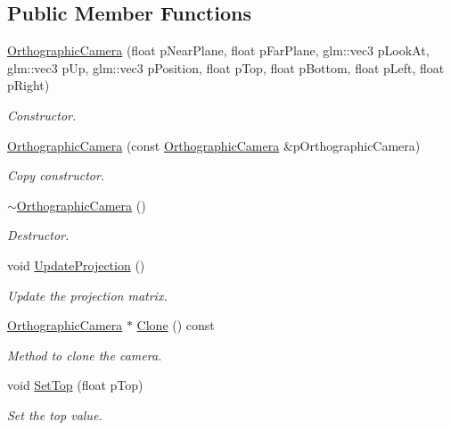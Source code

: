 \subsection*{Public Member Functions}
\begin{DoxyCompactItemize}
\item 
\hyperlink{class_orthographic_camera_a794762aa66ade1f025ca62304b2e8c40}{Orthographic\+Camera} (float p\+Near\+Plane, float p\+Far\+Plane, glm\+::vec3 p\+Look\+At, glm\+::vec3 p\+Up, glm\+::vec3 p\+Position, float p\+Top, float p\+Bottom, float p\+Left, float p\+Right)
\begin{DoxyCompactList}\small\item\em Constructor. \end{DoxyCompactList}\item 
\hyperlink{class_orthographic_camera_a889267a0f4815b523b07034d656986de}{Orthographic\+Camera} (const \hyperlink{class_orthographic_camera}{Orthographic\+Camera} \&p\+Orthographic\+Camera)
\begin{DoxyCompactList}\small\item\em Copy constructor. \end{DoxyCompactList}\item 
\hyperlink{class_orthographic_camera_a9c8a9cc81e87af987c6fcda276bdd52d}{$\sim$\+Orthographic\+Camera} ()
\begin{DoxyCompactList}\small\item\em Destructor. \end{DoxyCompactList}\item 
void \hyperlink{class_orthographic_camera_abea153f1372b655f423679015d42af52}{Update\+Projection} ()
\begin{DoxyCompactList}\small\item\em Update the projection matrix. \end{DoxyCompactList}\item 
\hyperlink{class_orthographic_camera}{Orthographic\+Camera} $\ast$ \hyperlink{class_orthographic_camera_a31414e246ccb74590fe025a82f1f6bd5}{Clone} () const 
\begin{DoxyCompactList}\small\item\em Method to clone the camera. \end{DoxyCompactList}\item 
void \hyperlink{class_orthographic_camera_ad6f26cfe2311ed951562f6cb856f7b3a}{Set\+Top} (float p\+Top)
\begin{DoxyCompactList}\small\item\em Set the top value. \end{DoxyCompactList}\item 

\end{DoxyCompactItemize}
